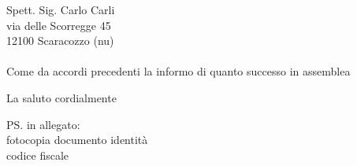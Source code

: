 \documentclass[12pt,a4paper]{letter}
\date{}
\begin{document}
	{Spett. Sig. Carlo Carli \\
	via delle Scorregge 45 \\
12100 Scaracozzo (nu)} \\ \\

Come da accordi precedenti la informo di quanto successo in assemblea

\closing{La saluto cordialmente}

\ps{in allegato:\\
fotocopia documento identità \\
codice fiscale}

	
\end{document}
